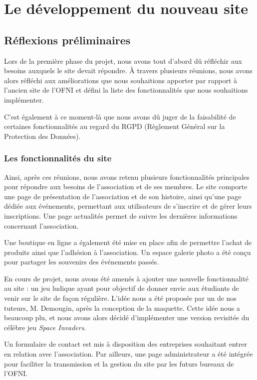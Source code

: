 \chapter{Le développement du nouveau site}

\section{Réflexions préliminaires}

Lors de la première phase du projet, nous avons tout d'abord dû réfléchir aux besoins auxquels le site devait répondre.  
À travers plusieurs réunions, nous avons alors réfléchi aux améliorations que nous souhaitions apporter par rapport à l’ancien site de l’OFNI et défini la liste des fonctionnalités que nous souhaitions implémenter.  

C'est également à ce moment-là que nous avons dû juger de la faisabilité de certaines fonctionnalités au regard du RGPD (Règlement Général sur la Protection des Données).

\subsection{Les fonctionnalités du site}

Ainsi, après ces réunions, nous avons retenu plusieurs fonctionnalités principales pour répondre aux besoins de l'association et de ses membres. Le site comporte une page de présentation de l’association et de son histoire, ainsi qu’une page dédiée aux événements, permettant aux utilisateurs de s’inscrire et de gérer leurs inscriptions. Une page actualités permet de suivre les dernières informations concernant l’association.  

Une boutique en ligne a également été mise en place afin de permettre l’achat de produits ainsi que l’adhésion à l’association. Un espace galerie photo a été conçu pour partager les souvenirs des événements passés.  

En cours de projet, nous avons été amenés à ajouter une nouvelle fonctionnalité au site : un jeu ludique ayant pour objectif de donner envie aux étudiants de venir sur le site de façon régulière. L'idée nous a été proposée par un de nos tuteurs, M. Demougin, après la conception de la maquette. Cette idée nous a beaucoup plu, et nous avons alors décidé d'implémenter une version revisitée du célèbre jeu \textit{Space Invaders}.  

Un formulaire de contact est mis à disposition des entreprises souhaitant entrer en relation avec l’association. Par ailleurs, une page administrateur a été intégrée pour faciliter la transmission et la gestion du site par les futurs bureaux de l’OFNI.  

